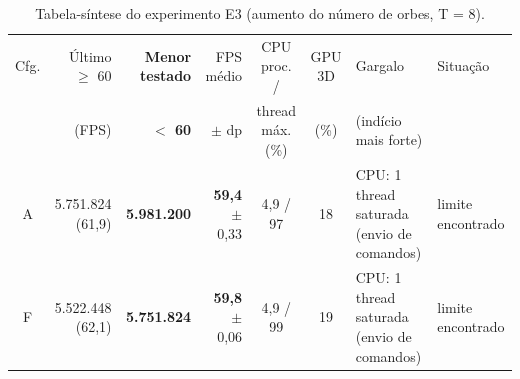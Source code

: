 \begin{table}[H]
\centering
\caption{Tabela-síntese do experimento E3 (aumento do número de orbes, T = 8).}
\label{tab:sintese_e3}
\scriptsize
\setlength{\tabcolsep}{3pt}
\begin{tabularx}{\textwidth}{c r r r c c L P{1.6cm}}
\toprule
Cfg. & Último $\geq$ 60 & \textbf{Menor testado} & FPS médio & CPU proc. / & GPU 3D & Gargalo & Situação \\
 & (FPS) & \textbf{$<$ 60} & $\pm$ dp & thread máx. (\%) & (\%) & (indício mais forte) & \\
\midrule
A & 5.751.824 (61,9) & \textbf{5.981.200} & \textbf{59,4} $\pm$ 0,33 & 4,9 / 97 & 18 & CPU: 1 thread saturada (envio de comandos) & limite encontrado \\
F & 5.522.448 (62,1) & \textbf{5.751.824} & \textbf{59,8} $\pm$ 0,06 & 4,9 / 99 & 19 & CPU: 1 thread saturada (envio de comandos) & limite encontrado \\
\bottomrule
\end{tabularx}
\end{table}
